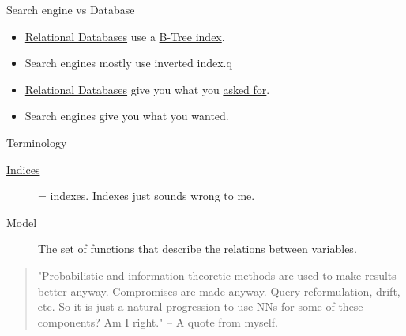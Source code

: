 \documentclass[presentation]{beamer}
\begin{document}
\begin{frame}[label={sec:orgd3847dd}]{Search engine vs Database}
\begin{itemize}
\item \uline{Relational Databases} use a \uline{B-Tree index}.
\item \alert{Search engines} mostly use \alert{inverted index}.q
\item \uline{Relational Databases} give you what you \uline{asked for}.
\item \alert{Search engines} give you what you \alert{wanted}.
\end{itemize}
\end{frame}

\begin{frame}[label={sec:org7caa6ef}]{Terminology}
\begin{description}
\item[{\uline{Indices}}] = indexes. Indexes just sounds wrong to me.
\item[{\uline{Model}}] The \alert{set of functions} that describe the relations between variables.
\end{description}

\begin{quote}
"Probabilistic and information theoretic methods are used to make results better anyway.
Compromises are made anyway. Query reformulation, drift, etc.
So it is just a natural progression to use NNs for some of these components? Am I right." -- A quote from myself.
\end{quote}
\end{frame}
\end{document}
